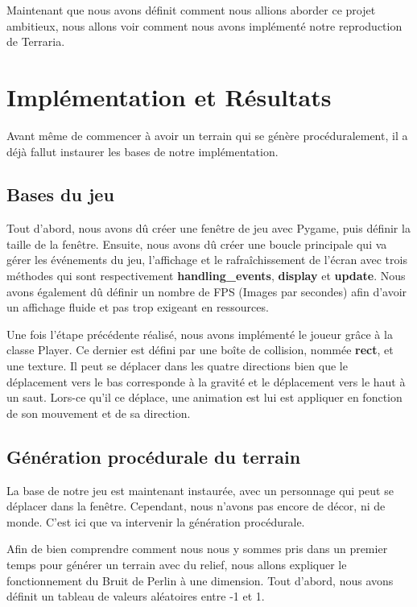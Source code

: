 \documentclass{article}
\begin{document}
Maintenant que nous avons définit comment nous allions aborder ce projet ambitieux, nous allons voir comment nous avons implémenté notre reproduction de Terraria.

\section{Implémentation et Résultats}
\label{Implémentation}

Avant même de commencer à avoir un terrain qui se génère procéduralement, il a déjà fallut instaurer les bases de notre implémentation.

\subsection{Bases du jeu}

Tout d'abord, nous avons dû créer une fenêtre de jeu avec Pygame, puis définir la taille de la fenêtre. Ensuite, nous avons dû créer une boucle principale qui va gérer les événements du jeu, l'affichage et le rafraîchissement de l'écran avec trois méthodes qui sont respectivement \textbf{handling\_events}, \textbf{display} et \textbf{update}. Nous avons également dû définir un nombre de FPS (Images par secondes) afin d'avoir un affichage fluide et pas trop exigeant en ressources.\par
Une fois l'étape précédente réalisé, nous avons implémenté le joueur grâce à la classe Player. Ce dernier est défini par une boîte de collision, nommée \textbf{rect}, et une texture. Il peut se déplacer dans les quatre directions bien que le déplacement vers le bas corresponde à la gravité et le déplacement vers le haut à un saut. Lors-ce qu'il ce déplace, une animation est lui est appliquer en fonction de son mouvement et de sa direction.\par

\subsection{Génération procédurale du terrain}

La base de notre jeu est maintenant instaurée, avec un personnage qui peut se déplacer dans la fenêtre. Cependant, nous n'avons pas encore de décor, ni de monde. C'est ici que va intervenir la génération procédurale.\par
Afin de bien comprendre comment nous nous y sommes pris dans un premier temps pour générer un terrain avec du relief, nous allons expliquer le fonctionnement du Bruit de Perlin à une dimension. Tout d'abord, nous avons définit un tableau de valeurs aléatoires entre -1 et 1.\par
\end{document}

